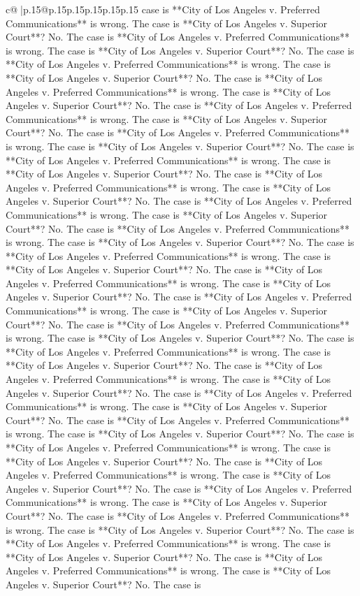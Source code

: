 \documentclass{article}
\begin{document}
{\begin{supertabular}{c@{$\;$}|p{.15\linewidth}@{}p{.15\linewidth}p{.15\linewidth}p{.15\linewidth}p{.15\linewidth}p{.15\linewidth}}
{{{case is **City of Los Angeles v. Preferred Communications** is wrong. The case is **City of Los Angeles v. Superior Court**? No. The case is **City of Los Angeles v. Preferred Communications** is wrong. The case is **City of Los Angeles v. Superior Court**? No. The case is **City of Los Angeles v. Preferred Communications** is wrong. The case is **City of Los Angeles v. Superior Court**? No. The case is **City of Los Angeles v. Preferred Communications** is wrong. The case is **City of Los Angeles v. Superior Court**? No. The case is **City of Los Angeles v. Preferred Communications** is wrong. The case is **City of Los Angeles v. Superior Court**? No. The case is **City of Los Angeles v. Preferred Communications** is wrong. The case is **City of Los Angeles v. Superior Court**? No. The case is **City of Los Angeles v. Preferred Communications** is wrong. The case is **City of Los Angeles v. Superior Court**? No. The case is **City of Los Angeles v. Preferred Communications** is wrong. The case is **City of Los Angeles v. Superior Court**? No. The case is **City of Los Angeles v. Preferred Communications** is wrong. The case is **City of Los Angeles v. Superior Court**? No. The case is **City of Los Angeles v. Preferred Communications** is wrong. The case is **City of Los Angeles v. Superior Court**? No. The case is **City of Los Angeles v. Preferred Communications** is wrong. The case is **City of Los Angeles v. Superior Court**? No. The case is **City of Los Angeles v. Preferred Communications** is wrong. The case is **City of Los Angeles v. Superior Court**? No. The case is **City of Los Angeles v. Preferred Communications** is wrong. The case is **City of Los Angeles v. Superior Court**? No. The case is **City of Los Angeles v. Preferred Communications** is wrong. The case is **City of Los Angeles v. Superior Court**? No. The case is **City of Los Angeles v. Preferred Communications** is wrong. The case is **City of Los Angeles v. Superior Court**? No. The case is **City of Los Angeles v. Preferred Communications** is wrong. The case is **City of Los Angeles v. Superior Court**? No. The case is **City of Los Angeles v. Preferred Communications** is wrong. The case is **City of Los Angeles v. Superior Court**? No. The case is **City of Los Angeles v. Preferred Communications** is wrong. The case is **City of Los Angeles v. Superior Court**? No. The case is **City of Los Angeles v. Preferred Communications** is wrong. The case is **City of Los Angeles v. Superior Court**? No. The case is **City of Los Angeles v. Preferred Communications** is wrong. The case is **City of Los Angeles v. Superior Court**? No. The case is **City of Los Angeles v. Preferred Communications** is wrong. The case is **City of Los Angeles v. Superior Court**? No. The case is **City of Los Angeles v. Preferred Communications** is wrong. The case is **City of Los Angeles v. Superior Court**? No. The case is **City of Los Angeles v. Preferred Communications** is wrong. The case is **City of Los Angeles v. Superior Court**? No. The case is **City of Los Angeles v. Preferred Communications** is wrong. The case is **City of Los Angeles v. Superior Court**? No. The case is }}}
\end{supertabular}}
\end{document}
